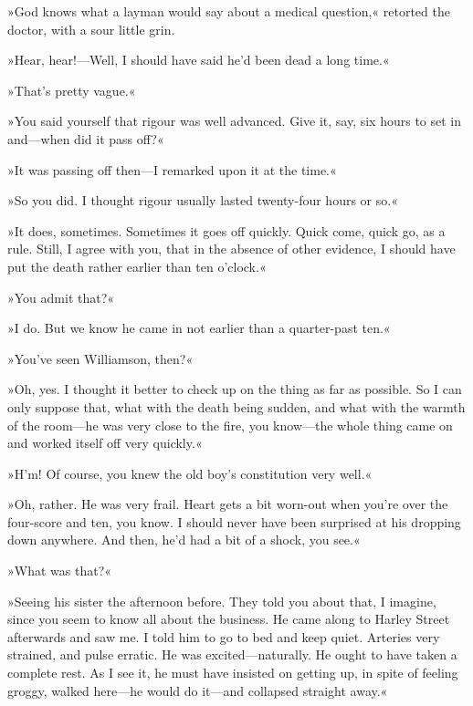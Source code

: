 »God knows what a layman would say about a medical question,« retorted the doctor, with a sour little grin.

»Hear, hear!---Well, I should have said he'd been dead a long time.«

»That's pretty vague.«

»You said yourself that rigour was well advanced. Give it, say, six hours to set in and\allowbreak---\allowbreak when did it pass off?«

»It was passing off then\allowbreak---\allowbreak I remarked upon it at the time.«

»So you did. I thought rigour usually lasted twenty-four hours or so.«

»It does, sometimes. Sometimes it goes off quickly. Quick come, quick go, as a rule. Still, I agree with you, that in the absence of other evidence, I should have put the death rather earlier than ten o'clock.«

»You admit that?«

»I do. But we know he came in not earlier than a quarter-past ten.«

»You've seen Williamson, then?«

»Oh, yes. I thought it better to check up on the thing as far as possible. So I can only suppose that, what with the death being sudden, and what with the warmth of the room\allowbreak---\allowbreak he was very close to the fire, you know\allowbreak---\allowbreak the whole thing came on and worked itself off very quickly.«

»H'm! Of course, you knew the old boy's constitution very well.«

»Oh, rather. He was very frail. Heart gets a bit worn-out when you're over the four-score and ten, you know. I should never have been surprised at his dropping down anywhere. And then, he'd had a bit of a shock, you see.«

»What was that?«

»Seeing his sister the afternoon before. They told you about that, I imagine, since you seem to know all about the business. He came along to Harley Street afterwards and saw me. I told him to go to bed and keep quiet. Arteries very strained, and pulse erratic. He was excited\allowbreak---\allowbreak naturally. He ought to have taken a complete rest. As I see it, he must have insisted on getting up, in spite of feeling groggy, walked here\allowbreak---\allowbreak he would do it\allowbreak---\allowbreak and collapsed straight away.«

